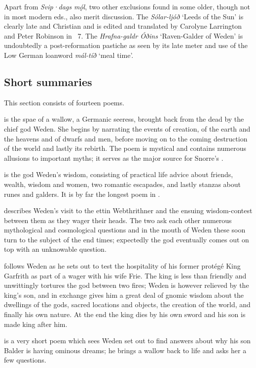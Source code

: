 Apart from \emph{Svip·dags mǫ́l}, two other exclusions found in some older, though not in most modern eds., also merit discussion.  The \emph{Sólar-ljóð} ‘Leeds of the Sun’ is clearly late and Christian and is edited and translated by Carolyne Larrington and Peter Robinson in \Skp\ 7.  The \emph{Hrafna-galdr Óðins} ‘Raven-Galder of Weden’ is undoubtedly a post-reformation pastiche as seen by its late meter and use of the Low German loanword \emph{mál-tíð} ‘meal time’.

\subsection{Short summaries}

This section consists of fourteen poems.

 is the spae of a wallow, a Germanic seeress, brought back from the dead by the chief god Weden.  She begins by narrating the events of creation, of the earth and the heavens and of dwarfs and men, before moving on to the coming destruction of the world and lastly its rebirth.  The poem is mystical and contains numerous allusions to important myths; it serves as the major source for Snorre’s \Gylfaginning.

 is the god Weden’s wisdom, consisting of practical life advice about friends, wealth, wisdom and women, two romantic escapades, and lastly stanzas about runes and galders.  It is by far the longest poem in \Regius.

 describes Weden’s visit to the ettin Webthrithner and the ensuing wisdom-contest between them as they wager their heads.  The two ask each other numerous mythological and cosmological questions and in the mouth of Weden these soon turn to the subject of the end times; expectedly the god eventually comes out on top with an unknowable question.

 follows Weden as he sets out to test the hospitality of his former protégé King Garfrith as part of a wager with his wife Frie.  The king is less than friendly and unwittingly tortures the god between two fires; Weden is however relieved by the king’s son, and in exchange gives him a great deal of gnomic wisdom about the dwellings of the gods, sacred locations and objects, the creation of the world, and finally his own nature.  At the end the king dies by his own sword and his son is made king after him.

 is a very short poem which sees Weden set out to find answers about why his son Balder is having ominous dreams; he brings a wallow back to life and asks her a few questions.

